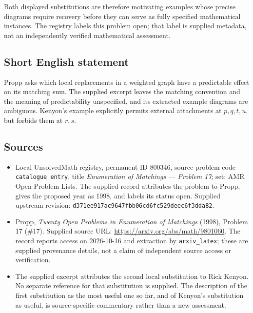 \documentclass[11pt]{article}
\begin{document}
Both displayed substitutions are therefore motivating examples whose precise diagrams require recovery before they can serve as fully specified mathematical instances. The registry labels this problem open; that label is supplied metadata, not an independently verified mathematical assessment.
\subsection{Short English statement}
Propp asks which local replacements in a weighted graph have a predictable effect on its matching sum. The supplied excerpt leaves the matching convention and the meaning of predictability unspecified, and its extracted example diagrams are ambiguous. Kenyon's example explicitly permits external attachments at \(p,q,t,u\), but forbids them at \(r,s\).
\subsection{Sources}
\begin{itemize}
\item Local UnsolvedMath registry, permanent ID \(800346\), source problem code \texttt{catalogue entry}, title \emph{Enumeration of Matchings --- Problem 17}; set: AMR Open Problem Lists. The supplied record attributes the problem to Propp, gives the proposed year as 1998, and labels its status open. Supplied upstream revision: \texttt{d371ee917ac9647fbb06cd6fc529deec6f3dda82}.
\item Propp, \emph{Twenty Open Problems in Enumeration of Matchings} (1998), Problem 17 (\#17). Supplied source URL: \url{https://arxiv.org/abs/math/9801060}. The record reports access on 2026-10-16 and extraction by \texttt{arxiv\_latex}; these are supplied provenance details, not a claim of independent source access or verification.
\item The supplied excerpt attributes the second local substitution to Rick Kenyon. No separate reference for that substitution is supplied. The description of the first substitution as the most useful one so far, and of Kenyon's substitution as useful, is source-specific commentary rather than a new assessment.
\end{itemize}
\end{document}

